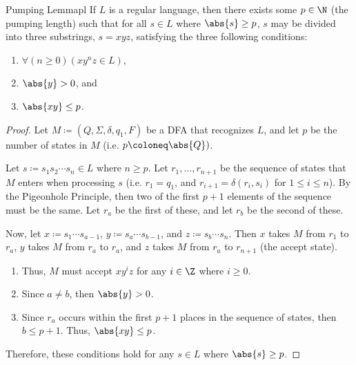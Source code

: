 \begin{thmbox}{Pumping Lemma}{pl}
    If $L$ is a regular language, then there exists some $p \in \N$ (the pumping length) such that for all $s \in L$ where $\abs{s} \geq p$, $s$ may be divided into three substrings, $s = x y z$, satisfying the three following conditions:
    \begin{enumerate}[noitemsep]
        \item $\forall (n \geq 0) \left( x y^n z \in L \right)$,
        \item $\abs{y} > 0$, and
        \item $\abs{x y} \leq p$.
    \end{enumerate}
    \tcblower
    \begin{proof}
        Let $M \coloneq  (Q, \Sigma, \delta, q_1, F)$ be a DFA that recognizes $L$, and let $p$ be the number of states in $M$ (i.e. $p \coloneq \abs{Q})$.

        Let $s \coloneq s_1 s_2 \cdots s_n \in L$ where $n \geq p$. Let $r_1, \ldots, r_{n+1}$ be the sequence of states that $M$ enters when processing $s$ (i.e. $r_1 = q_1$, and $r_{i+1} = \delta(r_i, s_i)$ for $1 \leq i \leq n$). By the Pigeonhole Principle, then two of the first $p+1$ elements of the sequence must be the same. Let $r_a$ be the first of these, and let $r_b$ be the second of these.

        Now, let $x \coloneq s_1 \cdots s_{a-1}$, $y \coloneq s_a \cdots s_{b-1}$, and $z \coloneq s_b \cdots s_n$. Then $x$ takes $M$ from $r_1$ to $r_a$, $y$ takes $M$ from $r_a$ to $r_a$, and $z$ takes $M$ from $r_a$ to $r_{n+1}$ (the accept state).
        \begin{enumerate}
            \item Thus, $M$ must accept $xy^iz$ for any $i \in \Z$ where $i \geq 0$.
            \item Since $a \neq b$, then $\abs{y} > 0$.
            \item Since $r_a$ occurs within the first $p+1$ places in the sequence of states, then $b \leq p+1$. Thus, $\abs{xy} \leq p$.
        \end{enumerate}
        Therefore, these conditions hold for any $s \in L$ where $\abs{s} \geq p$.
    \end{proof}
\end{thmbox}


